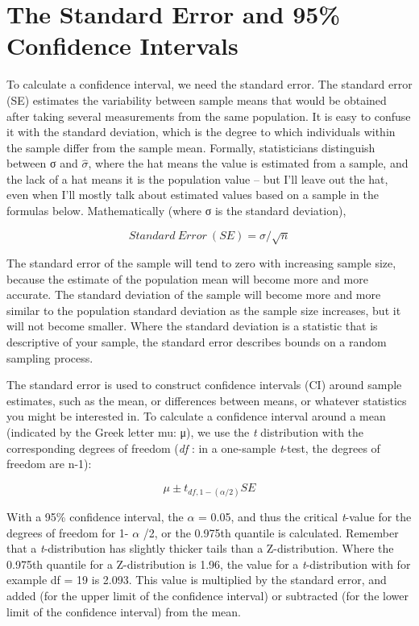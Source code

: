 \documentclass[
  oneside]{krantz}
\begin{document}
\hypertarget{the-standard-error-and-95-confidence-intervals}{%
\section{The Standard Error and 95\% Confidence Intervals}\label{the-standard-error-and-95-confidence-intervals}}

To calculate a confidence interval, we need the standard error. The standard error (SE) estimates the variability between sample means that would be obtained after taking several measurements from the same population. It is easy to confuse it with the standard deviation, which is the degree to which individuals within the sample differ from the sample mean. Formally, statisticians distinguish between σ and \(\widehat{\sigma}\), where the hat means the value is estimated from a sample, and the lack of a hat means it is the population value -- but I'll leave out the hat, even when I'll mostly talk about estimated values based on a sample in the formulas below. Mathematically (where σ is the standard
deviation),

\[
Standard \ Error \ (SE) = \sigma/\sqrt n
\]

The standard error of the sample will tend to zero with increasing sample size, because the estimate of the population mean will become more and more accurate. The standard deviation of the sample will become more and more similar to the population standard deviation as the sample size increases, but it will not become smaller. Where the standard deviation is a statistic that is descriptive of your sample, the standard error describes bounds on a random sampling process.

The standard error is used to construct confidence intervals (CI) around sample estimates, such as the mean, or differences between means, or whatever statistics you might be interested in. To calculate a confidence interval around a mean (indicated by the Greek letter mu: μ), we use the \emph{t} distribution with the corresponding degrees of freedom (\emph{df} : in a one-sample \emph{t}-test, the degrees of freedom are n-1):

\[
\mu \pm t_{df, 1-(\alpha/2)} SE
\]

With a 95\% confidence interval, the \(\alpha\) = 0.05, and thus the critical \emph{t}-value for the degrees of freedom for 1- \(\alpha\) /2, or the 0.975th quantile is calculated. Remember that a \emph{t}-distribution has slightly thicker tails than a Z-distribution. Where the 0.975th quantile for a Z-distribution is 1.96, the value for a \emph{t}-distribution with for example df = 19 is 2.093. This value is multiplied by the standard error, and added (for the upper limit of the confidence interval) or subtracted (for the lower limit of the confidence interval) from the mean.
\end{document}
